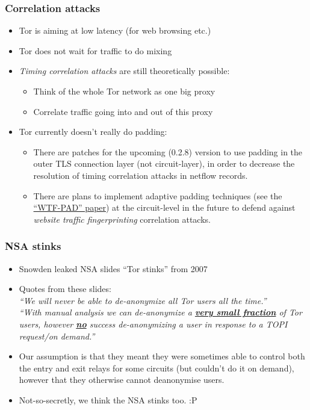 \begin{frame}
  \frametitle{Correlation attacks}
  \begin{itemize}
    \item Tor is aiming at low latency (for web browsing etc.)
    \item Tor does not wait for traffic to do mixing
    \item<2-> \emph{Timing correlation attacks} are still theoretically possible:
      \begin{itemize}
        \item Think of the whole Tor network as one big proxy
        \item Correlate traffic going into and out of this proxy
      \end{itemize}
    \item<3-> Tor currently doesn't really do padding:
      \begin{itemize}
        \item There are patches for the upcoming (0.2.8) version to use padding
          in the outer TLS connection layer (not circuit-layer), in order to
          decrease the resolution of timing correlation attacks in netflow records.
        \item There are plans to implement adaptive padding techniques (see the
          \href{http://arxiv.org/pdf/1512.00524.pdf}{``WTF-PAD'' paper}) at the
          circuit-level in the future to defend against \emph{website traffic
            fingerprinting} correlation attacks.
      \end{itemize}
  \end{itemize}
\end{frame}


\begin{frame}
  \frametitle{NSA stinks}
  \begin{itemize}
    \item Snowden leaked NSA slides ``Tor stinks'' from 2007
    \item Quotes from these slides:\\[4mm]
      \emph{``We will never be able to de-anonymize all Tor users all the time.''}\\[4mm]
      \emph{``With manual analysis we can de-anonymize a \textbf{\underline{very small fraction}} of Tor users, 
      however \textbf{\underline{no}} success de-anonymizing a user in response to a TOPI request/on demand.''}
    \item<2-> Our assumption is that they meant they were sometimes able to
      control both the entry and exit relays for some circuits (but couldn't do
      it on demand), however that they otherwise cannot deanonymise users.
    \item<3-> Not-so-secretly, we think the NSA stinks too. :P
  \end{itemize}
\end{frame}


